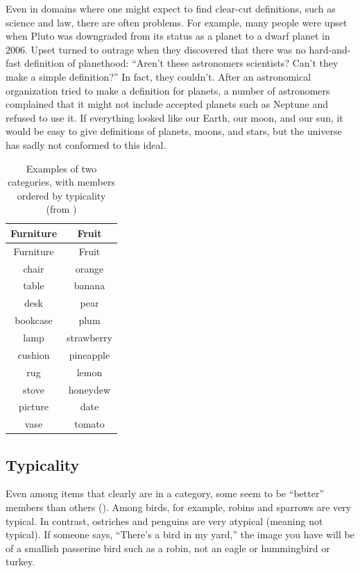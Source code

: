\documentclass[
]{krantz}
\begin{document}
Even in domains where one might expect to find clear-cut definitions, such as science and law, there are often problems. For example, many people were upset when Pluto was downgraded from its status as a planet to a dwarf planet in 2006. Upset turned to outrage when they discovered that there was no hard-and-fast definition of planethood: ``Aren't these astronomers scientists? Can't they make a simple definition?'' In fact, they couldn't. After an astronomical organization tried to make a definition for planets, a number of astronomers complained that it might not include accepted planets such as Neptune and refused to use it. If everything looked like our Earth, our moon, and our sun, it would be easy to give definitions of planets, moons, and stars, but the universe has sadly not conformed to this ideal.

\begin{longtable}[]{@{}cc@{}}
\caption{\label{tab:typicality} Examples of two categories, with members ordered by typicality (from )}\tabularnewline
\toprule\noalign{}
Furniture & Fruit \\
\midrule\noalign{}
\endfirsthead
\toprule\noalign{}
Furniture & Fruit \\
\midrule\noalign{}
\endhead
\bottomrule\noalign{}
\endlastfoot
chair & orange \\
table & banana \\
desk & pear \\
bookcase & plum \\
lamp & strawberry \\
cushion & pineapple \\
rug & lemon \\
stove & honeydew \\
picture & date \\
vase & tomato \\
\end{longtable}

\subsection*{Typicality}\label{typicality}


Even among items that clearly are in a category, some seem to be ``better'' members than others (). Among birds, for example, robins and sparrows are very typical. In contrast, ostriches and penguins are very atypical (meaning not typical). If someone says, ``There's a bird in my yard,'' the image you have will be of a smallish passerine bird such as a robin, not an eagle or hummingbird or turkey.
\end{document}
